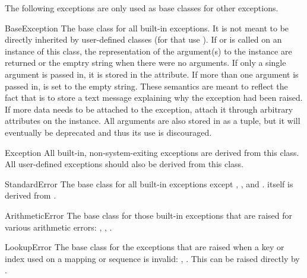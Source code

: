 
The following exceptions are only used as base classes for other
exceptions.

\begin{excdesc}{BaseException}
The base class for all built-in exceptions.  It is not meant to be directly
inherited by user-defined classes (for that use ).  If
 or  is called on an instance of this
class, the representation of the argument(s) to the instance are returned or
the emptry string when there were no arguments.  If only a single argument is
passed in, it is stored in the  attribute.  If more than one
argument is passed in,  is set to the empty string.  These
semantics are meant to reflect the fact that  is to store a
text message explaining why the exception had been raised.  If more data needs
to be attached to the exception, attach it through arbitrary attributes on the
instance.  All arguments are also stored in  as a tuple, but it will
eventually be deprecated and thus its use is discouraged.
\end{excdesc}

\begin{excdesc}{Exception}
All built-in, non-system-exiting exceptions are derived
from this class.  All user-defined exceptions should also be derived
from this class.
\end{excdesc}

\begin{excdesc}{StandardError}
The base class for all built-in exceptions except
, ,
 and .
 itself is derived from .
\end{excdesc}

\begin{excdesc}{ArithmeticError}
The base class for those built-in exceptions that are raised for
various arithmetic errors: ,
, .
\end{excdesc}

\begin{excdesc}{LookupError}
The base class for the exceptions that are raised when a key or
index used on a mapping or sequence is invalid: ,
.  This can be raised directly by
.
\end{excdesc}

